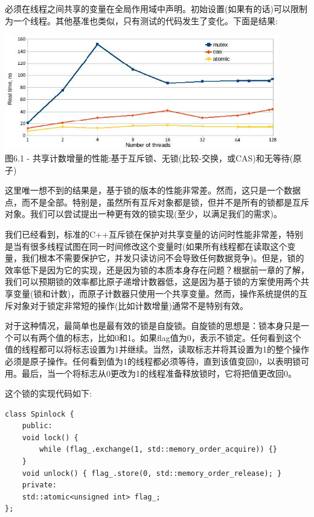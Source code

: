 必须在线程之间共享的变量在全局作用域中声明。初始设置(如果有的话)可以限制为一个线程。其他基准也类似，只有测试的代码发生了变化。下面是结果:

\begin{center}
\includegraphics[width=0.9\textwidth]{content/2/chapter6/images/1.jpg}\\
图6.1 - 共享计数增量的性能:基于互斥锁、无锁(比较-交换，或CAS)和无等待(原子)
\end{center}

这里唯一想不到的结果是，基于锁的版本的性能非常差。然而，这只是一个数据点，而不是全部。特别是，虽然所有互斥对象都是锁，但并不是所有的锁都是互斥对象。我们可以尝试提出一种更有效的锁实现(至少，以满足我们的需求)。


我们已经看到，标准的C++互斥锁在保护对共享变量的访问时性能非常差，特别是当有很多线程试图在同一时间修改这个变量时(如果所有线程都在读取这个变量，我们根本不需要保护它，并发只读访问不会导致任何数据竞争)。但是，锁的效率低下是因为它的实现，还是因为锁的本质本身存在问题？根据前一章的了解，我们可以预期锁的效率都比原子递增计数器低，这是因为基于锁的方案使用两个共享变量(锁和计数)，而原子计数器只使用一个共享变量。然而，操作系统提供的互斥对象对于锁定非常短的操作(比如计数增量)通常不是特别有效。

对于这种情况，最简单也是最有效的锁是自旋锁。自旋锁的思想是：锁本身只是一个可以有两个值的标志，比如0和1。如果flag值为0，表示不锁定。任何看到这个值的线程都可以将标志设置为1并继续。当然，读取标志并将其设置为1的整个操作必须是原子操作。任何看到值为1的线程都必须等待，直到该值变回0，以表明锁可用。最后，当一个将标志从0更改为1的线程准备释放锁时，它将把值更改回0。

这个锁的实现代码如下:

\begin{lstlisting}[style=styleCXX]
class Spinlock {
	public:
	void lock() {
		while (flag_.exchange(1, std::memory_order_acquire)) {}
	}
	void unlock() { flag_.store(0, std::memory_order_release); }
	private:
	std::atomic<unsigned int> flag_;
};
\end{lstlisting}

